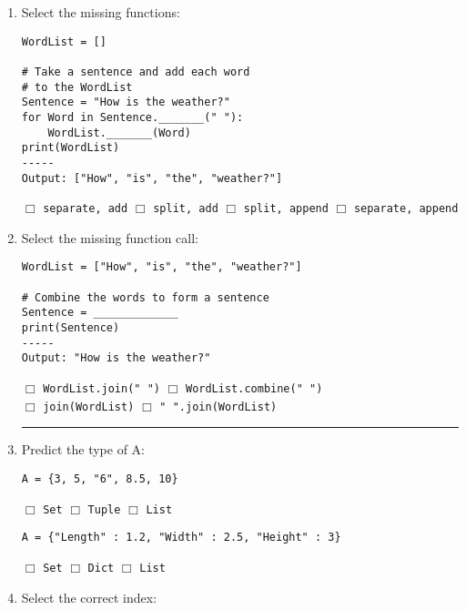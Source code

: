 \documentclass[11pt]{report}
\begin{document}
\begin{enumerate}
    \item Select the missing functions:

    \begin{verbatim}
WordList = []

# Take a sentence and add each word
# to the WordList
Sentence = "How is the weather?"
for Word in Sentence._______(" "):
    WordList._______(Word)
print(WordList)
-----
Output: ["How", "is", "the", "weather?"]
    \end{verbatim}
    $\Box$ {\tt separate, add} \hspace{2em} $\Box$ {\tt split, add} \hspace{2em} $\Box$ {\tt split, append} \hspace{2em} $\Box$ {\tt separate, append}

    \item Select the missing function call:

    \begin{verbatim}
WordList = ["How", "is", "the", "weather?"]

# Combine the words to form a sentence
Sentence = _____________
print(Sentence)
-----
Output: "How is the weather?"
    \end{verbatim}
    $\Box$ {\tt WordList.join(" ")} \hspace{2em} $\Box$ {\tt WordList.combine(" ")}\\
    $\Box$ {\tt join(WordList)} \hspace{4.1em} $\Box$ {\tt " ".join(WordList)}

\vspace{2em}
\hrule
\vspace{2em}

\item Predict the type of A:

\begin{verbatim}
A = {3, 5, "6", 8.5, 10}
\end{verbatim}
$\Box$ {\tt Set} \hspace{2em} $\Box$ {\tt Tuple} \hspace{2em} $\Box$ {\tt List}

\begin{verbatim}
A = {"Length" : 1.2, "Width" : 2.5, "Height" : 3}
\end{verbatim}
$\Box$ {\tt Set} \hspace{2em} $\Box$ {\tt Dict} \hspace{2em} $\Box$ {\tt List}

\item Select the correct index:


\end{enumerate}
\end{document}
